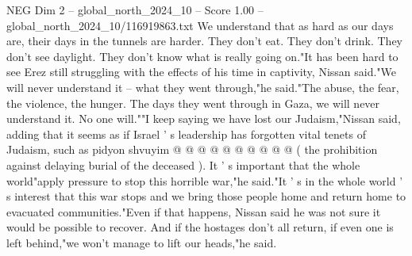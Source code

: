 \begin{textsample}{NEG Dim 2 – global\_north\_2024\_10 – Score 1.00 – global\_north\_2024\_10/116919863.txt}
We understand that as hard as our days are, their days in the tunnels are harder.
They don't eat.
They don't drink.
They don't see daylight.
They don't know what is really going on."It has been hard to see Erez still struggling with the effects of his time in captivity, Nissan said."We will never understand it -- what they went through,"he said."The abuse, the fear, the violence, the hunger.
The days they went through in Gaza, we will never understand it.
No one will.""I keep saying we have lost our Judaism,"Nissan said, adding that it seems as if Israel ' s leadership has forgotten vital tenets of Judaism, such as pidyon shvuyim @ @ @ @ @ @ @ @ @ @ ( the prohibition against delaying burial of the deceased ).
It ' s important that the whole world"apply pressure to stop this horrible war,"he said."It ' s in the whole world ' s interest that this war stops and we bring those people home and return home to evacuated communities."Even if that happens, Nissan said he was not sure it would be possible to recover.
And if the hostages don't all return, if even one is left behind,"we won't manage to lift our heads,"he said.

\end{textsample}
